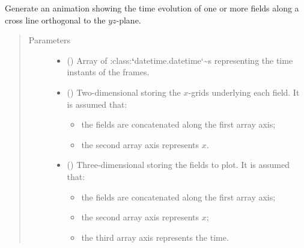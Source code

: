 \documentclass[letterpaper,10pt,english]{sphinxmanual}
\begin{document}
\begin{fulllineitems}
\label{\detokenize{api:tasmania.utils.utils_plot.animation_profile_x_comparison}}
Generate an animation showing the time evolution of one or more fields along a cross line orthogonal
to the \(yz\)-plane.
\begin{quote}\begin{description}
\item[{Parameters}] \leavevmode\begin{itemize}
\item {} 
 () \textendash{} Array of :class:{\color{red}\bfseries{}{}`}datetime.datetime{}`\textasciitilde{}s representing the time instants of the frames.

\item {} 
 () \textendash{} 
Two-dimensional  storing the \(x\)-grids underlying each field.
It is assumed that:
\begin{itemize}
\item {} 
the fields are concatenated along the first array axis;

\item {} 
the second array axis represents \(x\).

\end{itemize}


\item {} 
 () \textendash{} 
Three-dimensional  storing the fields to plot.
It is assumed that:
\begin{itemize}
\item {} 
the fields are concatenated along the first array axis;

\item {} 
the second array axis represents \(x\);

\item {} 
the third array axis represents the time.


\end{itemize}
\end{itemize}
\end{description}
\end{quote}
\end{fulllineitems}
\end{document}
